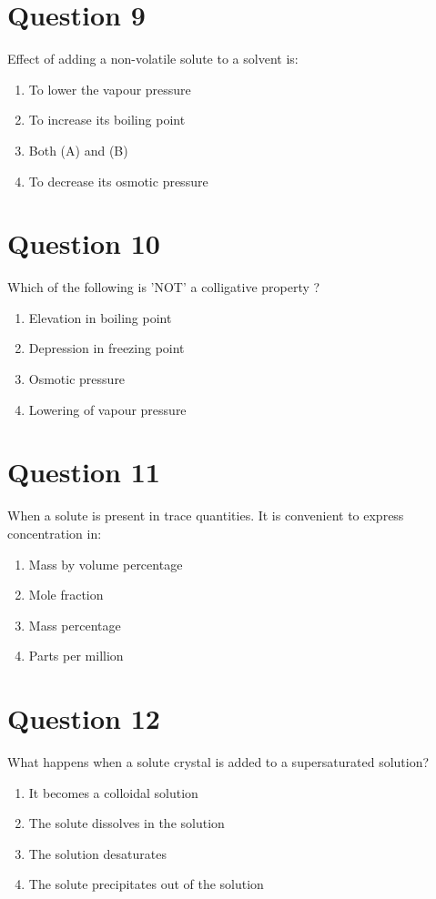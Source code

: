 \documentclass{article}
\begin{document}
\section*{Question 9}
Effect of adding a non-volatile solute to a solvent is:
\begin{enumerate}[label=(\alph*)]
\item To lower the vapour pressure
\item To increase its boiling point
\item Both (A) and (B)
\item To decrease its osmotic pressure
\end{enumerate}
\newpage
\section*{Question 10}
Which of the following is 'NOT' a colligative property ?
\begin{enumerate}[label=(\alph*)]
\item Elevation in boiling point
\item Depression in freezing point
\item Osmotic pressure
\item Lowering of vapour pressure
\end{enumerate}
\newpage
\section*{Question 11}
When a solute is present in trace quantities. It is convenient to express concentration in:
\begin{enumerate}[label=(\alph*)]
\item Mass by volume percentage
\item Mole fraction
\item Mass percentage
\item Parts per million
\end{enumerate}
\newpage
\section*{Question 12}
What happens when a solute crystal is added to a supersaturated solution?
\begin{enumerate}[label=(\alph*)]
\item It becomes a colloidal solution
\item The solute dissolves in the solution
\item The solution desaturates
\item The solute precipitates out of the solution
\end{enumerate}
\newpage
\end{document}
